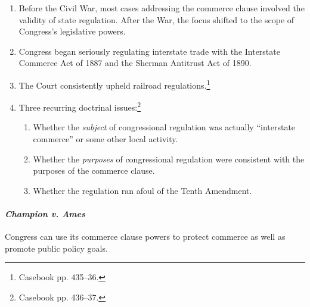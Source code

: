 \begin{enumerate}
    \item Before the Civil War, most cases addressing the commerce clause 
    involved the validity of state regulation. After the War, the focus 
    shifted to the scope of Congress's legislative powers.
    \item Congress began seriously regulating interstate trade with the 
    Interstate Commerce Act of 1887 and the Sherman Antitrust Act of 1890.
    \item The Court consistently upheld railroad 
    regulations.\footnote{Casebook pp. 435--36.}
    \item Three recurring doctrinal issues:\footnote{Casebook pp. 436--37.}
    \begin{enumerate}
        \item Whether the \emph{subject} of congressional regulation was 
        actually ``interstate commerce'' or some other local activity.
        \item Whether the \emph{purposes} of congressional regulation were 
        consistent with the purposes of the commerce clause.
        \item Whether the regulation ran afoul of the Tenth Amendment.
    \end{enumerate}
\end{enumerate}

\paragraph{\emph{Champion v. Ames}}

Congress can use its commerce clause powers to protect commerce as well as 
promote public policy goals.

